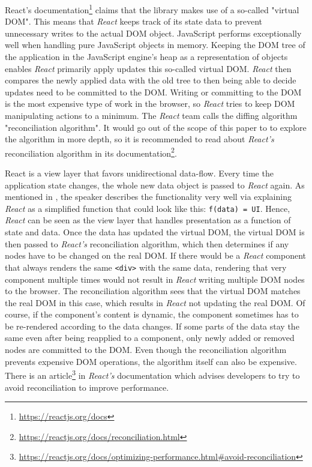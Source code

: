 React's documentation\footnote{\url{https://reactjs.org/docs}} claims that the library makes use of a so-called "virtual DOM". This means that \emph{React} keeps track of its state data to prevent unnecessary writes to the actual DOM object. JavaScript performs exceptionally well when handling pure JavaScript objects in memory. Keeping the DOM tree of the application in the JavaScript engine's heap as a representation of objects enables \emph{React} primarily apply updates this so-called virtual DOM. \emph{React} then compares the newly applied data with the old tree to then being able to decide updates need to be committed to the DOM. Writing or committing to the DOM is the most expensive type of work in the browser, so \emph{React} tries to keep DOM manipulating actions to a minimum. The \emph{React} team calls the diffing algorithm "reconciliation algorithm". It would go out of the scope of this paper to to explore the algorithm in more depth, so it is recommended to read about \emph{React's} reconciliation algorithm in its documentation\footnote{\url{https://reactjs.org/docs/reconciliation.html}}.

React is a view layer that favors unidirectional data-flow. Every time the application state changes, the whole new data object is passed to \emph{React} again. As mentioned in \cite[6:50]{ReactFoundingVideo}, the speaker describes the functionality very well via explaining \emph{React} as a simplified function that could look like this: \texttt{f(data) = UI}. Hence, \emph{React} can be seen as the view layer that handles presentation as a function of state and data. Once the data has updated the virtual DOM, the virtual DOM is then passed to \emph{React's} reconciliation algorithm, which then determines if any nodes have to be changed on the real DOM. If there would be a \emph{React} component that always renders the same \texttt{<div>} with the same data, rendering that very component multiple times would not result in \emph{React} writing multiple DOM nodes to the browser. The reconciliation algorithm sees that the virtual DOM matches the real DOM in this case, which results in \emph{React} not updating the real DOM. Of course, if the component's content is dynamic, the component sometimes has to be re-rendered according to the data changes. If some parts of the data stay the same even after being reapplied to a component, only newly added or removed nodes are committed to the DOM. Even though the reconciliation algorithm prevents expensive DOM operations, the algorithm itself can also be expensive. There is an article\footnote{\url{https://reactjs.org/docs/optimizing-performance.html\#avoid-reconciliation}} in \emph{React's} documentation which advises developers to try to avoid reconciliation to improve performance.

